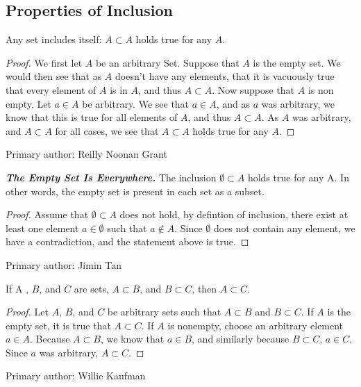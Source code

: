 \subsection{Properties of Inclusion}%
				\begin{majorEx}%
                Any set includes itself: $A \subset A$ holds true for any $A$.
				\end{majorEx}
                \begin{proof}
                  We first let $A$ be an arbitrary Set. Suppose that $A$ is the empty set. We would then see that as $A$ doesn't have any elements, that it is vacuously true that every element of $A$ is in $A$, and thus  $A \subset A$. Now suppose that $A$ is non empty. Let $a \in A$ be arbitrary. We see that $a \in A$, and as $a$ was arbitrary, we know that this is true for all elements of $A$, and thus $A \subset A$. As $A$ was arbitrary, and $A \subset A$ for all cases, we see that $A \subset A$ holds true for any $A$.
                \end{proof}
                Primary author: Reilly Noonan Grant
				\begin{majorEx}%
					\textbf{\textit{The Empty Set Is Everywhere.}} The inclusion $\emptyset \subset A$ holds true for any A. In other words, the empty set is present in each set as a subset.
                     \begin{proof}
                    Assume that $\emptyset \subset A$ does not hold, by defintion of inclusion, there exist at least one element $a \in \emptyset$ such that $a \not\in A$. Since $\emptyset$ does not contain any element, we have a contradiction, and the statement above is true.
                    \end{proof}
                    Primary author: Jimin Tan
				\end{majorEx}
				\begin{majorEx}%
					If A , $B$, and $C$ are sets, $A \subset B$, and $B \subset C$, then $A \subset C$. 
				\end{majorEx}
                \begin{proof}
                Let $A$, $B$, and $C$ be arbitrary sets such that $A \subset B$ and $B \subset C$. If $A$ is the empty set, it is true that $A \subset C$. If $A$ is nonempty, choose an arbitrary element $a \in A$. Because $A \subset B$, we know that $a \in B$, and similarly because  $B \subset C$, $a \in C$. Since $a$ was arbitrary, $A \subset C$. \newline
                \end{proof}
      		 Primary author: Willie Kaufman
